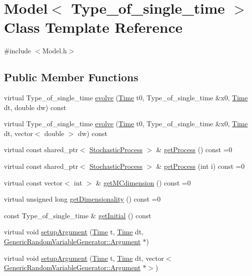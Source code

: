 \hypertarget{class_model}{}\section{Model$<$ Type\+\_\+of\+\_\+single\+\_\+time $>$ Class Template Reference}
\label{class_model}


{\ttfamily \#include $<$Model.\+h$>$}

\subsection*{Public Member Functions}
\begin{DoxyCompactItemize}
\item 
virtual Type\+\_\+of\+\_\+single\+\_\+time \hyperlink{class_model_a18b1fe1476b5adde8d6125e7f6a7f932}{evolve} (\hyperlink{_name_def_8h_ac2d3e0ba793497bcca555c7c2cf64ff3}{Time} t0, Type\+\_\+of\+\_\+single\+\_\+time \&x0, \hyperlink{_name_def_8h_ac2d3e0ba793497bcca555c7c2cf64ff3}{Time} dt, double dw) const
\item 
virtual Type\+\_\+of\+\_\+single\+\_\+time \hyperlink{class_model_a2bc277990d41a0abc4e2658f94107481}{evolve} (\hyperlink{_name_def_8h_ac2d3e0ba793497bcca555c7c2cf64ff3}{Time} t0, Type\+\_\+of\+\_\+single\+\_\+time \&x0, \hyperlink{_name_def_8h_ac2d3e0ba793497bcca555c7c2cf64ff3}{Time} dt, vector$<$ double $>$ dw) const
\item 
virtual const shared\+\_\+ptr$<$ \hyperlink{class_stochastic_process}{Stochastic\+Process} $>$ \& \hyperlink{class_model_a6f584114ffcbd4eac04a2bbf8e9cede2}{get\+Process} () const =0
\item 
virtual const shared\+\_\+ptr$<$ \hyperlink{class_stochastic_process}{Stochastic\+Process} $>$ \& \hyperlink{class_model_a7b9e58a51a5d244aa7012f1cdb7aebd8}{get\+Process} (int i) const =0
\item 
virtual const vector$<$ int $>$ \& \hyperlink{class_model_a11fb36244c91ca8c36317581b73bca08}{get\+M\+Cdimension} () const =0
\item 
virtual unsigned long \hyperlink{class_model_a26832ec2df24d7941783d3cd6d500898}{get\+Dimensionality} () const =0
\item 
const Type\+\_\+of\+\_\+single\+\_\+time \& \hyperlink{class_model_a22cdf510508e6cf3adc69e2bcd9d151e}{get\+Initial} () const
\item 
virtual void \hyperlink{class_model_a19ba3a18a45aad9012dbc6cbafb09e39}{setup\+Argument} (\hyperlink{_name_def_8h_ac2d3e0ba793497bcca555c7c2cf64ff3}{Time} t, \hyperlink{_name_def_8h_ac2d3e0ba793497bcca555c7c2cf64ff3}{Time} dt, \hyperlink{class_generic_random_variable_generator_1_1_argument}{Generic\+Random\+Variable\+Generator\+::\+Argument} $\ast$)
\item 
virtual void \hyperlink{class_model_a603717845fc9c6317d65a39409d10aed}{setup\+Argument} (\hyperlink{_name_def_8h_ac2d3e0ba793497bcca555c7c2cf64ff3}{Time} t, \hyperlink{_name_def_8h_ac2d3e0ba793497bcca555c7c2cf64ff3}{Time} dt, vector$<$ \hyperlink{class_generic_random_variable_generator_1_1_argument}{Generic\+Random\+Variable\+Generator\+::\+Argument} $\ast$$>$)
\end{DoxyCompactItemize}
